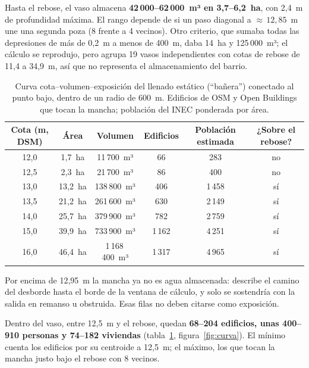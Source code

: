 \documentclass{sosg-informe}
\begin{document}
Hasta el rebose, el vaso almacena \textbf{42\,000--62\,000~m³ en 3,7--6,2~ha}, con 2,4~m de profundidad máxima. El rango depende de si un paso diagonal a ${\approx}\,12,85$~m une una segunda poza (8 frente a 4 vecinos). Otro criterio, que sumaba todas las depresiones de más de 0,2~m a menos de 400~m, daba 14~ha y 125\,000~m³; el cálculo se reprodujo, pero agrupa 19 vasos independientes con cotas de rebose de 11,4 a 34,9~m, así que no representa el almacenamiento del barrio.

\begin{table}[ht]
  \centering\small
  \caption{Curva cota--volumen--exposición del llenado estático (\enquote{bañera}) conectado al punto bajo, dentro de un radio de 600~m. Edificios de OSM y Open Buildings que tocan la mancha; población del INEC ponderada por área.}
  \label{tab:curva}
  \begin{tabular}{cccccc}
    \toprule
    Cota (m, DSM) & Área & Volumen & Edificios & Población estimada & ¿Sobre el rebose? \\
    \midrule
    12,0 & 1,7~ha & 11\,700~m³ & 66 & 283 & no \\
    12,5 & 2,3~ha & 21\,700~m³ & 86 & 400 & no \\
    13,0 & 13,2~ha & 138\,800~m³ & 406 & 1\,458 & sí \\
    13,5 & 21,2~ha & 261\,600~m³ & 630 & 2\,149 & sí \\
    14,0 & 25,7~ha & 379\,900~m³ & 782 & 2\,759 & sí \\
    15,0 & 39,9~ha & 733\,900~m³ & 1\,162 & 4\,251 & sí \\
    16,0 & 46,4~ha & 1\,168\,400~m³ & 1\,317 & 4\,965 & sí \\
    \bottomrule
  \end{tabular}
  \par\vspace{3pt}\raggedright\footnotesize Por encima de 12,95~m la mancha ya no es agua almacenada: describe el camino del desborde hasta el borde de la ventana de cálculo, y solo se sostendría con la salida en remanso u obstruida. Esas filas no deben citarse como exposición.
\end{table}

Dentro del vaso, entre 12,5~m y el rebose, quedan \textbf{68--204 edificios, unas 400--910 personas y 74--182 viviendas} (tabla~\ref{tab:curva}, figura~\ref{fig:curva}). El mínimo cuenta los edificios por su centroide a 12,5~m; el máximo, los que tocan la mancha justo bajo el rebose con 8 vecinos.
\end{document}
